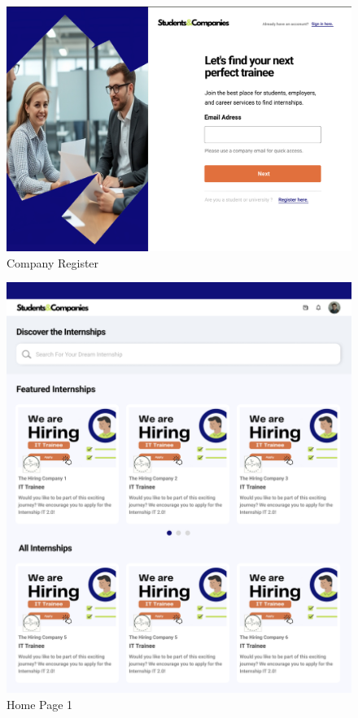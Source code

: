 \documentclass{article}
\begin{document}
\begin{figure}[H]
    \centering
    \includegraphics[scale = 0.40]{figures/Employer Register.png}
    \caption{Company Register}
     \centering
     
\end{figure}
    \begin{figure}[H]
    \centering
    \includegraphics[scale = 0.40]{figures/Home Page1.png}
    \caption{Home Page 1}
     \centering
\end{figure}
\end{document}
